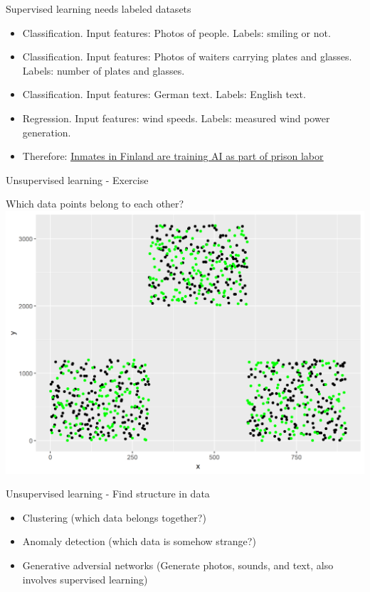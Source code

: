 \documentclass[color=usenames,dvipsnames]{beamer}
\begin{document}
\begin{frame}{Supervised learning needs labeled datasets} 

\begin{itemize}
	\item Classification. Input features: Photos of people. Labels: smiling or not.
	\item Classification. Input features: Photos of waiters carrying plates and glasses. Labels: number of plates and glasses.
    \item Classification. Input features: German text. Labels: English text.
	\item Regression. Input features: wind speeds. Labels: measured wind power generation.
	\item Therefore: 
		\href{https://www.theverge.com/2019/3/28/18285572/prison-labor-finland-artificial-intelligence-data-tagging-vainu}{\underline{Inmates in Finland are training AI as part of prison labor}}
\end{itemize}

\end{frame}


\begin{frame}{Unsupervised learning - Exercise} 

\begin{center}
	Which data points belong to each other?\\
\includegraphics[width=0.8\linewidth]{../figures/clustering.png}
\end{center}


\end{frame}

\begin{frame}{Unsupervised learning - Find structure in data} 

\begin{itemize}
	\item Clustering (which data belongs together?)
	\item Anomaly detection (which data is somehow strange?)
	\item Generative adversial networks (Generate photos, sounds, and text, also involves supervised learning)
\end{itemize}

\end{frame}
\end{document}
